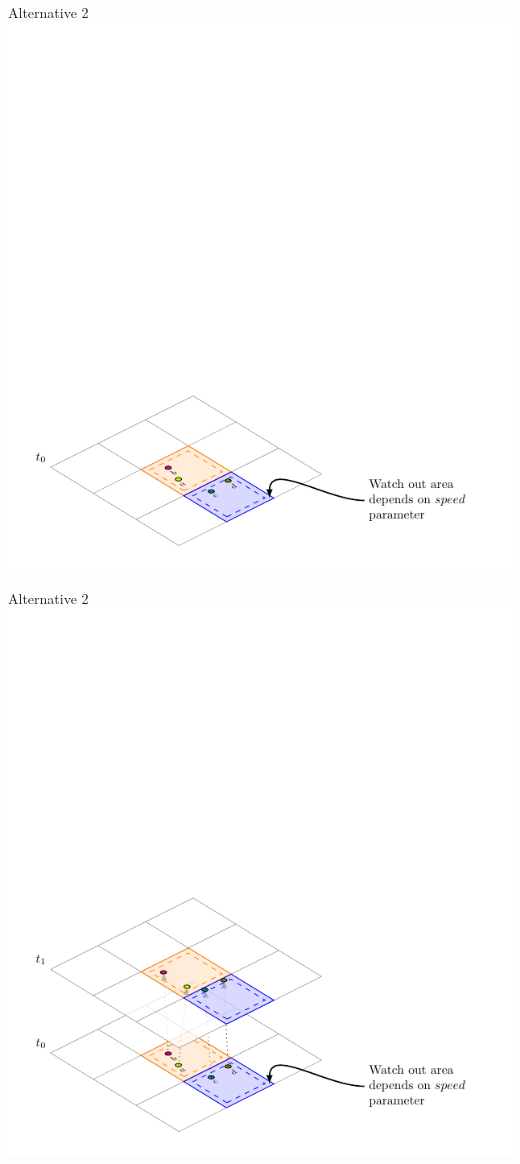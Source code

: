 \documentclass{beamer}
\begin{document}
\begin{frame}{Alternative 2}
    \centering
    \includegraphics[height=0.95\textheight]{Figures/A2/T0}
\end{frame}
\begin{frame}{Alternative 2}
    \centering
    \includegraphics[height=0.95\textheight]{Figures/A2/T1}
\end{frame}
\end{document}
